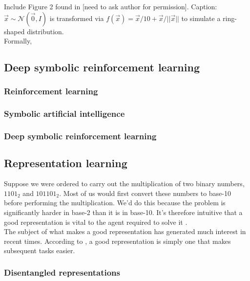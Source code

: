 \documentclass[12pt,twoside]{article}
\begin{document}
Include Figure 2 found in \cite{Doersch2016} [need to ask author for permission]. Caption: $\vec{x}\sim\mathcal{N}(\vec{0},I)$ is transformed via $f(\vec{x})=\vec{x}/10+\vec{x}/||\vec{x}||$ to simulate a ring-shaped distribution.\\

Formally, 

\subsection{Deep symbolic reinforcement learning}

\subsubsection{Reinforcement learning}

\subsubsection{Symbolic artificial intelligence}

\subsubsection{Deep symbolic reinforcement learning}

\subsection{Representation learning}

Suppose we were ordered to carry out the multiplication of two binary numbers, $1101_2$ and $101101_2$. Most of us would first convert these numbers to base-10 before performing the multiplication. We'd do this because the problem is significantly harder in base-2 than it is in base-10. It's therefore intuitive that a good representation is vital to the agent required to solve it \cite{IanGoodfellowYoshuaBengio2015}.\\

The subject of what makes a good representation has generated much interest in recent times. According to \cite{IanGoodfellowYoshuaBengio2015}, a good representation is simply one that makes subsequent tasks easier. 

\subsubsection{Disentangled representations}
\end{document}
